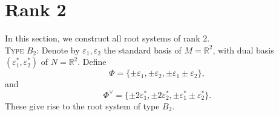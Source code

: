 \chapter{Rank 2}
\label{cha:rank-2}
In this section, we construct all root systems of rank 2. \\
\textsc{Type $B_2$}: Denote by $\varepsilon_1, \varepsilon_2$ the standard basis of $M = \mathbb{R}^2$, 
with dual basis $(\varepsilon_1^*, \varepsilon_2^*)$ of $N = \mathbb{R}^2$. Define 
\[
    \Phi = \{\pm \varepsilon_1, \pm \varepsilon_2, \pm\varepsilon_1\pm\varepsilon_2\},
\]
and 
\[
    \Phi^\vee = \{\pm 2\varepsilon^*_1, \pm 2 \varepsilon^*_2, \pm \varepsilon_1^* \pm \varepsilon_2^* \}.
\]
These give rise to the root system of type $B_2$.

